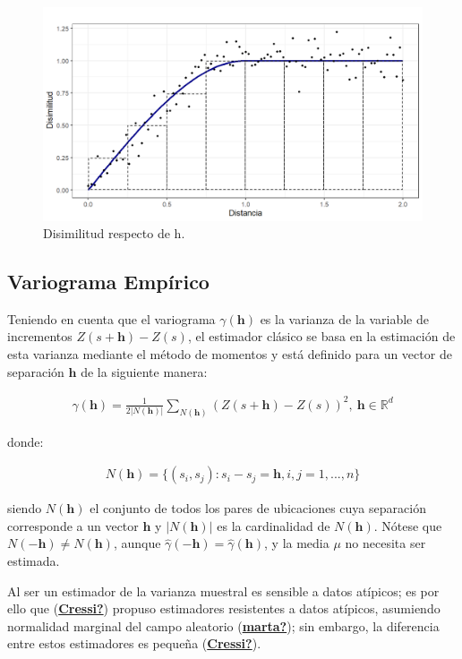 \documentclass[
]{book}
\begin{document}
\begin{figure}
\includegraphics[width=17.78in]{figuras/otros/var_cloud} \caption{Disimilitud respecto de h.}\label{fig:varcloud}
\end{figure}

\hypertarget{variograma-empuxedrico}{%
\subsection{Variograma Empírico}\label{variograma-empuxedrico}}

Teniendo en cuenta que el variograma \(\gamma(\textbf{h})\) es la varianza de la variable de incrementos \(Z(s+\textbf{h})-Z(s)\), el estimador clásico se basa en la estimación de esta varianza mediante el método de momentos y está definido para un vector de separación \(\textbf{h}\) de la siguiente manera:

\begin{align}
  \hat{\gamma}(\textbf{h})=\frac{1}{2|N(\textbf{h})|}\sum_{N(\textbf{h})}(Z(s+\textbf{h})-Z(s))^2, \ \textbf{h}\in \mathbb{R}^d  
\end{align}

donde:

\begin{align}
  N(\textbf{h})=\{(s_i,s_j):s_i-s_j=\textbf{h}, i,j=1,...,n\}  
\end{align}

siendo \(N(\textbf{h})\) el conjunto de todos los pares de ubicaciones cuya separación corresponde a un vector \(\textbf{h}\) y \(|N(\textbf{h})|\) es la cardinalidad de \(N(\textbf{h})\). Nótese que \(N(-\textbf{h})\neq N(\textbf{h})\), aunque \(\hat{\gamma}(-\textbf{h})=\hat{\gamma}(\textbf{h})\), y la media \(\mu\) no necesita ser estimada.

Al ser un estimador de la varianza muestral es sensible a datos atípicos; es por ello que (\protect\hyperlink{ref-Cressi}{\textbf{Cressi?}}) propuso estimadores resistentes a datos atípicos, asumiendo normalidad marginal del campo aleatorio (\protect\hyperlink{ref-marta}{\textbf{marta?}}); sin embargo, la diferencia entre estos estimadores es pequeña (\protect\hyperlink{ref-Cressi}{\textbf{Cressi?}}).
\end{document}

